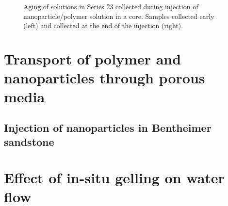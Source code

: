 \begin{figure}
    \centering
    \caption{Aging of solutions in Series 23 collected during injection of nanoparticle/polymer solution in a core. Samples collected early (left) and collected at the end of the injection (right).}
    \label{cht:s23visc80}
\end{figure}

\section{Transport of polymer and nanoparticles through porous media}
\subsection{Injection of nanoparticles in Bentheimer sandstone}












\section{ Effect of in-situ gelling on water flow}